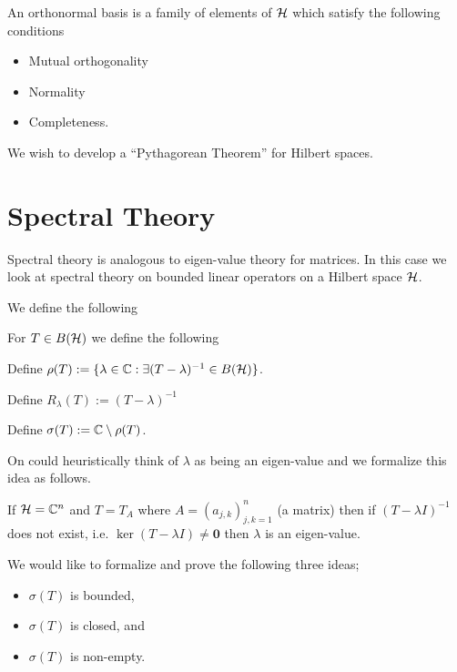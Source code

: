 \documentclass{unswmaths}
\begin{document}
An orthonormal basis is a family of elements of $ \mathcal{H} $ which satisfy the following conditions
\begin{itemize}
	\item Mutual orthogonality \\
	\item Normality \\
	\item Completeness.
\end{itemize}

We wish to develop a ``Pythagorean Theorem'' for Hilbert spaces.

\section*{Spectral Theory}

Spectral theory is analogous to eigen-value theory for matrices.
In this case we look at spectral theory on bounded linear operators on 
a Hilbert space $ \mathcal{H} $. 

We define the following

For $ T \in B( \mathcal{H} ) $ we define the following
\begin{definition}
	Define $ \rho(T) := \{ \lambda \in \mathbb{C} : \exists (T-\lambda)^{-1}  \in B( \mathcal{H} ) \} $.
\end{definition}
\begin{definition}[Resolvent]
	Define $ R_\lambda(T) := (T - \lambda)^{-1} $
\end{definition}
\begin{definition}[Spectrum]
	Define $ \sigma(T) := \mathbb{C} \setminus \rho(T) $.
\end{definition}

On could heuristically think of $ \lambda $ as being an eigen-value and we formalize this idea as follows.

If $ \mathcal{H} = \mathbb{C}^n $ and $ T = T_A $ where $ A = \left( a_{j,k} \right)_{j,k=1}^n $ (a matrix) then 
if $ (T - \lambda I)^{-1} $ does not exist, i.e. $ \ker( T - \lambda I) \neq \mathbf{0} $ then $ \lambda $ is
an eigen-value.

We would like to formalize and prove the following three ideas;
\begin{itemize}
	\item $ \sigma(T) $ is bounded,
	\item $ \sigma(T) $ is closed, and
	\item $ \sigma(T) $ is non-empty.
\end{itemize}
\end{document}

